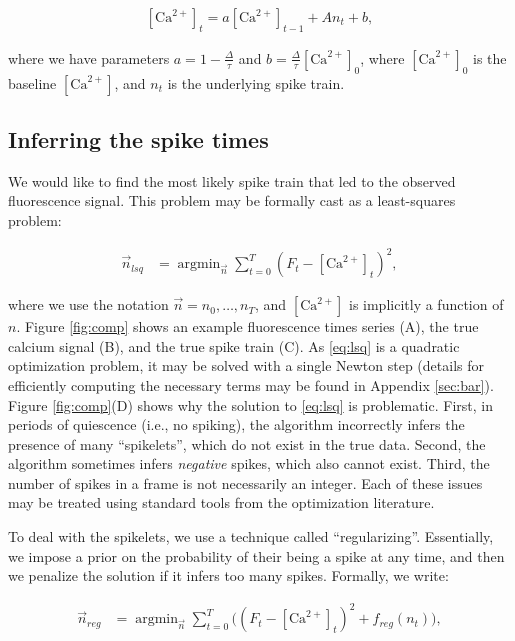 \documentclass[12pt]{article}
\providecommand{\ve}[1]{\vec{#1}}
\providecommand{\ve}[1]{\boldsymbol{#1}}
\DeclareMathOperator*{\argmin}{argmin}
\newcommand{\Ca}{[\text{Ca}^{2+}]}
\begin{document}
\begin{align} \label{eq:C_t}
\Ca_t = a \Ca_{t-1} +  A n_t + b,
\end{align}

\noindent where we have parameters $a=1-\frac{\Delta}{\tau}$ and $b=\frac{\Delta}{\tau}\Ca_0$, where $\Ca_0$ is the baseline $\Ca$, and $n_t$ is the underlying spike train. 

\subsection{Inferring the spike times}

We would like to find the most likely spike train that led to the observed fluorescence signal. This problem may be formally cast as a least-squares problem: 

\begin{align} \label{eq:lsq}
\ve{n}_{lsq} &= \argmin_{\ve{n}} \sum_{t=0}^T (F_t - \Ca_t)^2,
\end{align}

\noindent where we use the notation $\ve{n}=n_0,\ldots, n_T$, and $\Ca$ is implicitly a function of $n$. Figure \ref{fig:comp} shows an example fluorescence times series (A), the true calcium signal (B), and the true spike train (C). As \eqref{eq:lsq} is a quadratic optimization problem, it may be solved with a single Newton step (details for efficiently computing the necessary terms may be found in Appendix \ref{sec:bar}).  Figure \ref{fig:comp}(D) shows why the solution to \eqref{eq:lsq} is problematic.  First, in periods of quiescence (i.e., no spiking), the algorithm incorrectly infers the presence of many ``spikelets'', which do not exist in the true data.  Second, the algorithm sometimes infers \emph{negative} spikes, which also cannot exist. Third, the number of spikes in a frame is not necessarily an integer.  Each of these issues may be treated using standard tools from the optimization literature.

To deal with the spikelets, we use a technique called ``regularizing''.  Essentially, we impose a prior on the probability of their being a spike at any time, and then we penalize the solution if it infers too many spikes.  Formally, we write:

\begin{align} \label{eq:reg}
\ve{n}_{reg} &= \argmin_{\ve{n}} \sum_{t=0}^T \big((F_t - \Ca_t)^2 + f_{reg}(n_t) \big),
\end{align}
\end{document}
